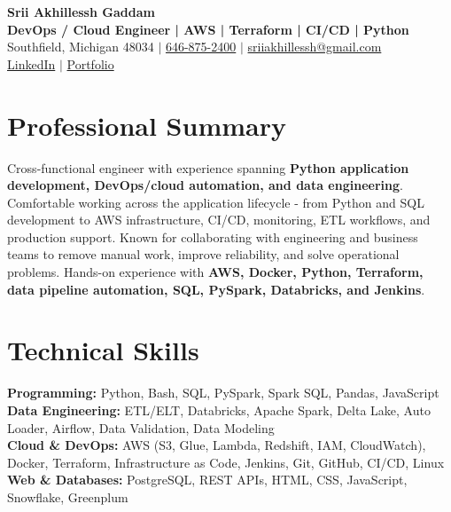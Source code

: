\documentclass[letterpaper,10pt]{article}
\begin{document}
\fontsize{9.35pt}{10.45pt}\selectfont

\begin{center}
    {\LARGE \textbf{Srii Akhillessh Gaddam}} \\[-1pt]
    \textbf{DevOps / Cloud Engineer | AWS | Terraform | CI/CD | Python} \\[2pt]
    Southfield, Michigan 48034 $|$
    \href{tel:6468752400}{646-875-2400} $|$
    \href{mailto:sriiakhillessh@gmail.com}{sriiakhillessh@gmail.com} \\[1pt]
    \href{https://www.linkedin.com/in/srii-akhiilessh-gaddam-b48668191/}{LinkedIn} $|$
    \href{https://sriiakhillesshg.github.io/portfolio/}{Portfolio}
\end{center}
\vspace{-8pt}

\section{Professional Summary}
\small{Cross-functional engineer with experience spanning \textbf{Python application development, DevOps/cloud automation, and data engineering}. Comfortable working across the application lifecycle - from Python and SQL development to AWS infrastructure, CI/CD, monitoring, ETL workflows, and production support. Known for collaborating with engineering and business teams to remove manual work, improve reliability, and solve operational problems. Hands-on experience with \textbf{AWS, Docker, Python, Terraform, data pipeline automation, SQL, PySpark, Databricks, and Jenkins}.}

\section{Technical Skills}
\small{
\textbf{Programming:} Python, Bash, SQL, PySpark, Spark SQL, Pandas, JavaScript \\
\textbf{Data Engineering:} ETL/ELT, Databricks, Apache Spark, Delta Lake, Auto Loader, Airflow, Data Validation, Data Modeling \\
\textbf{Cloud \& DevOps:} AWS (S3, Glue, Lambda, Redshift, IAM, CloudWatch), Docker, Terraform, Infrastructure as Code, Jenkins, Git, GitHub, CI/CD, Linux \\
\textbf{Web \& Databases:} PostgreSQL, REST APIs, HTML, CSS, JavaScript, Snowflake, Greenplum
}
\end{document}
